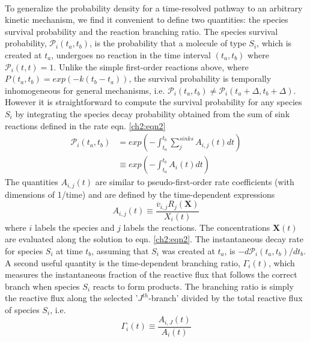 \paragraph{}
To generalize the probability density for a time-resolved pathway to an arbitrary
kinetic mechanism, we find it convenient to define two quantities: the species survival
probability and the reaction branching ratio. The species survival probability, $\mathcal{P}_{i}(t_a,t_b)$,
is the probability that a molecule of type $S_i$, which is created at $t_a$, undergoes no reaction
in the time interval $(t_a, t_b)$ where $\mathcal{P}_{i}(t,t)=1$. Unlike the simple first-order reactions
above, where $P(t_a, t_b) = exp(-k(t_b - t_a))$, the survival probability is temporally inhomogeneous
for general mechanisms, i.e. $\mathcal{P}_{i}(t_a,t_b) \neq \mathcal{P}_{i}(t_a+\Delta,t_b + \Delta) $. However it is
straightforward to compute the survival probability for any species $S_i$ by integrating the
species decay probability obtained from the sum of sink reactions defined in the rate
eqn. \ref{ch2:eqn2}
\begin{equation}
\label{ch2:eqn10}
\begin{split}
\mathcal{P}_{i}(t_a,t_b)&= exp\left( -\int_{t_a}^{t_b}{\sum_{j}^{sinks}{A_{i,j}(t)dt}} \right) \\
& \equiv exp\left( -\int_{t_a}^{t_b}{A_i(t)dt} \right)
\end{split}
\end{equation}
The quantities $A_{i,j}(t)$ are similar to pseudo-first-order rate coefficients (with dimensions
of 1/time) and are defined by the time-dependent expressions
\begin{equation}
\label{ch2:eqn11}
A_{i,j}(t) \equiv \frac{\overline{v}_{i,j}R_j(\textbf{X})}{X_i(t)}
\end{equation}
where $i$ labels the species and $j$ labels the reactions. The concentrations $\mathbf{X}(t)$ are evaluated
along the solution to eqn. \ref{ch2:eqn2}. The instantaneous decay rate for species $S_i$ at
time $t_b$, assuming that $S_i$ was created at $t_a$, is $-d\mathcal{P}_{i}(t_a,t_b) / d t_b$. A second useful quantity
is the time-dependent branching ratio, $\Gamma_{i}(t)$, which measures the instantaneous fraction
of the reactive flux that follows the correct branch when species $S_i$ reacts to form products.
The branching ratio is simply the reactive flux along the selected '$J^{th}$-branch'
divided by the total reactive flux of species $S_i$, i.e.
\begin{equation}
\label{ch2:eqn12}
\Gamma_i(t) \equiv \frac{A_{i,J}(t)}{A_i{(t)}}
\end{equation}
